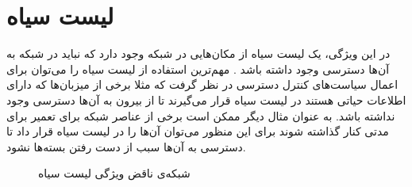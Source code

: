 \documentclass[
msc,
irfonts
]{./tex/tehran-thesis}
\newcommand{\پ}{پروژه/پایان‌نامه/رساله }
\theoremstyle{definition}
\theoremstyle{theorem}
\theoremstyle{definition}
\numberwithin{algorithm}{chapter}
\newcommand{\lf}[1]{\LTRfootnote{#1}}
\begin{document}
\section{لیست سیاه}
در این ویژگی، یک لیست‌ سیاه\lf{Blacklist}
از مکان‌هایی در شبکه وجود دارد که نباید در شبکه به آن‌ها دسترسی وجود داشته باشد
\cite{network-abstractions}.
مهم‌ترین استفاده از لیست سیاه را می‌توان برای اعمال سیاست‌های کنترل دسترسی در نظر گرفت که مثلا برخی از میزبان‌ها که دارای اطلاعات حیاتی هستند در لیست سیاه قرار می‌گیرند تا از بیرون به آن‌ها دسترسی وجود نداشته باشد.
به عنوان مثال دیگر ممکن است برخی از عناصر شبکه برای تعمیر برای مدتی کنار گذاشته شوند برای این منظور می‌توان آن‌ها را در لیست سیاه قرار داد تا دسترسی به آن‌ها سبب از دست رفتن بسته‌ها نشود.
\begin{figure}
    \centering
    \caption{ 
        شبکه‌ی ناقض ویژگی لیست سیاه
    }
    \label{fig:blacklist}
\end{figure}
\end{document}
